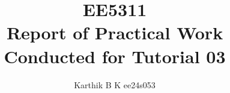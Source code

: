 \documentclass[12pt,a4paper]{article}
\begin{document}
\title{EE5311 \\ Report of Practical Work Conducted for Tutorial 03}
\author{Karthik B K ee24s053}
\maketitle







\end{document}
